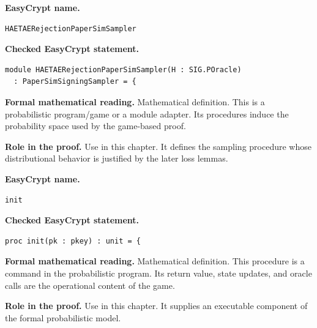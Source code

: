 \begin{formaldefinition}
\noindent\textbf{EasyCrypt name.}
\begin{lstlisting}[language=EasyCrypt,basicstyle=\ttfamily\scriptsize]
HAETAERejectionPaperSimSampler
\end{lstlisting}
\noindent\textbf{Checked EasyCrypt statement.}
\begin{lstlisting}[language=EasyCrypt,basicstyle=\ttfamily\scriptsize]
module HAETAERejectionPaperSimSampler(H : SIG.POracle)
  : PaperSimSigningSampler = {
\end{lstlisting}
\noindent\textbf{Formal mathematical reading.}
Mathematical definition. This is a probabilistic program/game or a module adapter.  Its procedures induce the probability space used by the game-based proof.

\noindent\textbf{Role in the proof.}
Use in this chapter. It defines the sampling procedure whose distributional behavior is justified by the later loss lemmas.

\end{formaldefinition}

\begin{formaldefinition}
\noindent\textbf{EasyCrypt name.}
\begin{lstlisting}[language=EasyCrypt,basicstyle=\ttfamily\scriptsize]
init
\end{lstlisting}
\noindent\textbf{Checked EasyCrypt statement.}
\begin{lstlisting}[language=EasyCrypt,basicstyle=\ttfamily\scriptsize]
proc init(pk : pkey) : unit = {
\end{lstlisting}
\noindent\textbf{Formal mathematical reading.}
Mathematical definition. This procedure is a command in the probabilistic program.  Its return value, state updates, and oracle calls are the operational content of the game.

\noindent\textbf{Role in the proof.}
Use in this chapter. It supplies an executable component of the formal probabilistic model.

\end{formaldefinition}

